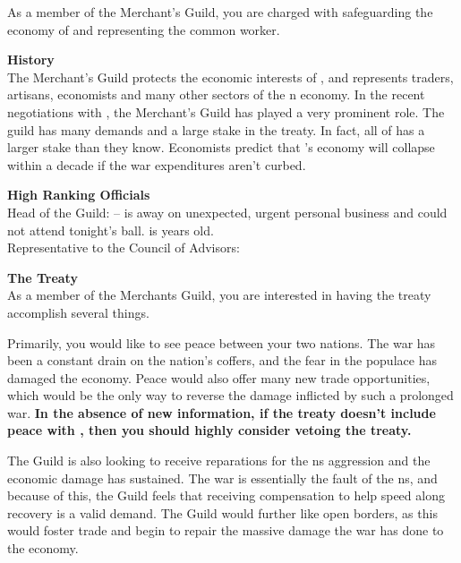 \documentclass[blue]{NeptuneBall}
\begin{document}
\name{\bMerchant{}}

As a member of the Merchant's Guild, you are charged with safeguarding the economy of \pAtlantis{} and representing the common worker.

{\bf History}\\
The Merchant's Guild protects the economic interests of \pAtlantis{}, and represents traders, artisans, economists and many other sectors of the \pAtlantis{}n economy. In the recent negotiations with \pPacifica{}, the Merchant's Guild has played a very prominent role. The guild has many demands and a large stake in the treaty. In fact, all of \pAtlantis{} has a larger stake than they know. Economists predict that \pAtlantis{}'s economy will collapse within a decade if the war expenditures aren't curbed.

{\bf High Ranking Officials}\\
Head of the Guild: \cNautilus{} -- \cNautilus{} is away on unexpected, urgent personal business and could not attend tonight's ball. \cNautilus{} is \cNautilus{\MYnumber} years old.\\
Representative to the Council of Advisors: \cSlave{}

{\bf The Treaty}\\
As a member of the Merchants Guild, you are interested in having the treaty accomplish several things. 

Primarily, you would like to see peace between your two nations. The war has been a constant drain on the nation's coffers, and the fear in the populace has damaged the economy. Peace would also offer many new trade opportunities, which would be the only way to reverse the damage inflicted by such a prolonged war. {\bf In the absence of new information, if the treaty doesn't include peace with \pPacifica{}, then you should highly consider vetoing the treaty.}

The Guild is also looking to receive reparations for the \pPacifica{}ns aggression and the economic damage \pAtlantis{} has sustained. The war is essentially the fault of the \pPacifica{}ns, and because of this, the Guild feels that receiving compensation to help speed along recovery is a valid demand. The Guild would further like open borders, as this would foster trade and begin to repair the massive damage the war has done to the economy.
\end{document}
